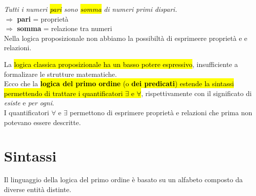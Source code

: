 \documentclass[a4paper, 12pt]{book}
\newcommand{\example}[2]{%
  \vspace{5pt}%
  \begin{tcolorbox}[
    colback=brown!5!white,
    colframe=brown!50!black,
    title=\textbf{Esempio: #1}, %
    coltitle=white,
    fonttitle=\bfseries,
    arc=2mm, %
    boxrule=1pt, %
    enhanced,
    breakable
  ]
  #2 %
  \end{tcolorbox}
  \vspace{5pt}%
}
\begin{document}
\example{}{\textit{Tutti i numeri \hl{pari} sono \hl{somma} di numeri primi dispari.} \\[0.2ex]
$\Rightarrow$ \textbf{pari} = proprietà \\[0.2ex]
$\Rightarrow$ \textbf{somma} = relazione tra numeri \\[0.3ex]
Nella logica proposizionale non abbiamo la possibiltà di esprimeere proprietà e e relazioni.}

La \hl{logica classica proposizionale ha un basso potere espressivo}, insufficiente a formalizare le strutture matematiche. \\[0.2ex]
Ecco che la \hl{\textbf{logica del primo ordine} (o \textbf{dei predicati}) estende la sintassi permettendo di trattare i quantificatori $\exists$ e $\forall$}, rispettivamente con il significato di \textit{esiste} e \textit{per ogni}. \\[0.2ex]
I quantificatori $\forall$ e $\exists$ permettono di esprimere proprietà e relazioni che prima non potevano essere descritte.

\section*{Sintassi}
Il linguaggio della logica del primo ordine è basato su un alfabeto composto da diverse entità distinte.
\end{document}
